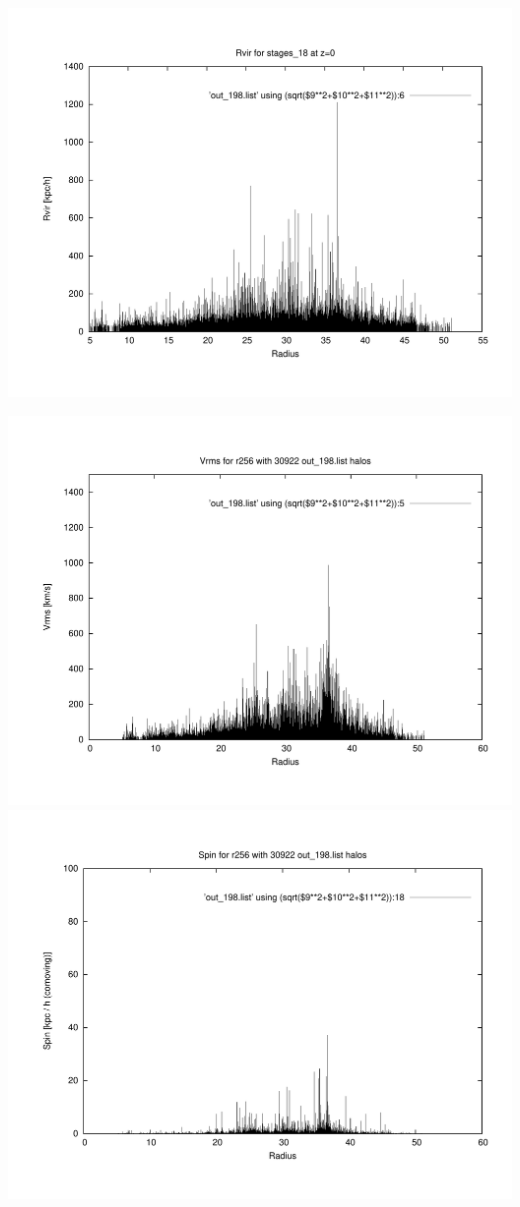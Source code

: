 \includegraphics[scale=0.3]{stages_18/plot_rvir_z0.pdf}

\includegraphics[scale=0.3]{stages_18/plot_Vrms_out_198.pdf}
\includegraphics[scale=0.3]{stages_18/plot_spin_out_198.pdf}






